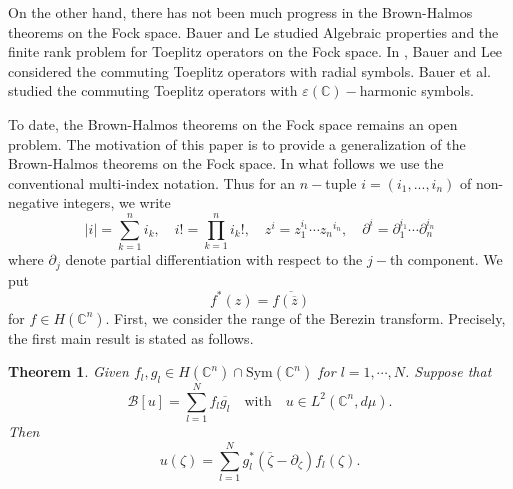 \documentclass[11pt,reqno]{amsart}
\newtheorem{theorem}{Theorem}
\theoremstyle{definition}
\begin{document}
On the other hand, there has not been much progress in the Brown-Halmos theorems on the Fock space. Bauer and Le \cite{Bauer1} studied Algebraic properties and the finite rank problem for Toeplitz operators on the Fock space.
 In \cite{Bauer2}, Bauer and Lee considered the commuting Toeplitz operators with  radial symbols.
 Bauer et al. \cite{Bauer} studied the commuting Toeplitz operators with $\varepsilon(\mathbb{C})-$harmonic symbols.



To date, the Brown-Halmos theorems  on the Fock space remains an open problem.
The motivation of this paper is to provide a generalization of the Brown-Halmos theorems on the Fock space.
In what follows we use the conventional multi-index notation. Thus for an $n-$tuple $i=(i_1,...,i_n)$ of non-negative integers, we write
$$|i|=\sum_{k=1}^n i_k,\quad i!=\prod_{k=1}^n i_k!,\quad z^i=z_1^{i_1}\cdots {z_n}^{i_n} ,\quad\partial^i=\partial_{1}^{i_1}\cdots \partial_{n}^{i_n} $$
where $\partial_j$ denote  partial differentiation with respect to the  $j-$th component.
 We put $$f^*(z)=\overline{f(\overline{z})}$$ for $f\in H(\mathbb{C}^n).$
First, we consider the range of the Berezin transform. Precisely, the first main result is stated as follows.
\begin{theorem}\label{TT1}
Given $f_l,g_l\in H(\mathbb{C}^n)\cap \mathrm{Sym}(\mathbb{C}^n)$ for $l=1,\cdots,N$. Suppose that  $$\mathcal{B}[u]=\sum_{l=1}^Nf_{l}\overline{g_l}\quad\text{with}\quad u\in L^{2}(\mathbb{C}^n,d\mu).$$ Then
$$u(\zeta)=\sum_{l=1}^N g_l^*(\overline{\zeta}-\partial_\zeta)f_l(\zeta).$$
\end{theorem}

\end{document}
